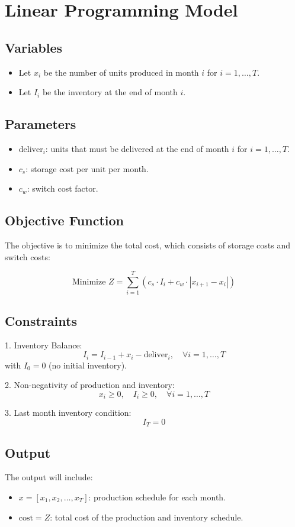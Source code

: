 \documentclass{article}
\begin{document}
\section*{Linear Programming Model}

\subsection*{Variables}
\begin{itemize}
    \item Let \( x_i \) be the number of units produced in month \( i \) for \( i = 1, \ldots, T \).
    \item Let \( I_i \) be the inventory at the end of month \( i \).
\end{itemize}

\subsection*{Parameters}
\begin{itemize}
    \item \( \text{deliver}_i \): units that must be delivered at the end of month \( i \) for \( i = 1, \ldots, T \).
    \item \( c_s \): storage cost per unit per month.
    \item \( c_w \): switch cost factor.
\end{itemize}

\subsection*{Objective Function}
The objective is to minimize the total cost, which consists of storage costs and switch costs:

\[
\text{Minimize } Z = \sum_{i=1}^{T} \left( c_s \cdot I_i + c_w \cdot |x_{i+1} - x_i| \right)
\]

\subsection*{Constraints}
1. Inventory Balance:
\[
I_i = I_{i-1} + x_i - \text{deliver}_i, \quad \forall i = 1, \ldots, T
\]
with \( I_0 = 0 \) (no initial inventory).

2. Non-negativity of production and inventory:
\[
x_i \geq 0, \quad I_i \geq 0, \quad \forall i = 1, \ldots, T
\]

3. Last month inventory condition:
\[
I_T = 0
\]

\subsection*{Output}
The output will include:
\begin{itemize}
    \item \( x = [x_1, x_2, \ldots, x_T] \): production schedule for each month.
    \item \( \text{cost} = Z \): total cost of the production and inventory schedule.
\end{itemize}
\end{document}
